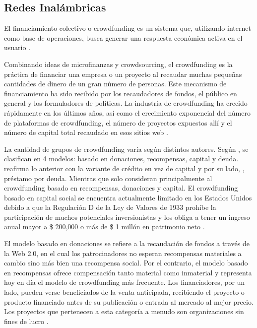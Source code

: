 \subsection{Redes Inalámbricas}
El financiamiento colectivo o crowdfunding es un sistema que, utilizando internet como base de operaciones, busca generar una respuesta económica activa en el usuario \parencite{cr_lopezgolan2017crowdfunding}.

Combinando ideas de microfinanzas y crowdsourcing, el crowdfunding es la práctica de financiar una empresa o un proyecto al recaudar muchas pequeñas cantidades de dinero de un gran número de personas. Este mecanismo de financiamiento ha sido recibido por los recaudadores de fondos, el público en general y los formuladores de políticas. La industria de crowdfunding ha crecido rápidamente en los últimos años, así como el crecimiento exponencial del número de plataformas de crowdfunding, el número de proyectos expuestos allí y el número de capital total recaudado en esos sitios web \parencite{cr_xuefeng2018chcrowdplatf}.

La cantidad de grupos de crowdfunding varía según distintos autores. Según \citeauthor{cr_hollas2013crwd}, se clasifican en 4 modelos: basado en donaciones, recompensas, capital y deuda. \citeauthor{cr_colgren2014risecrwd} reafirma lo anterior con la variante de crédito en vez de capital y por su lado, \citeauthor{cr_collins2014crwd}, préstamo por deuda. Mientras que \citeauthor{cr_lee2018fintech} solo consideran principalmente al crowdfunding basado en recompensas, donaciones y capital. El crowdfunding basado en capital social se encuentra actualmente limitado en los Estados Unidos debido a que la Regulación D de la Ley de Valores de 1933 prohíbe la participación de muchos potenciales inversionistas y los obliga a tener un ingreso anual mayor a \$ 200,000 o más de \$ 1 millón en patrimonio neto \parencite{cr_lichtig2015crowdfunding}.

El modelo basado en donaciones se refiere a la recaudación de fondos a través de la Web 2.0, en el cual los patrocinadores no esperan recompensas materiales a cambio sino más bien una recompensa social. Por el contrario, el modelo basado en recompensas ofrece compensación tanto material como inmaterial y representa hoy en día el modelo de crowdfunding más frecuente. Los financiadores, por un lado, pueden verse beneficiados de la venta anticipada, recibiendo el proyecto o producto financiado antes de su publicación o entrada al mercado al mejor precio. Los proyectos que pertenecen a esta categoría a menudo son organizaciones sin fines de lucro \parencite{cr_kraus2016crowdfunding_strategies}.

